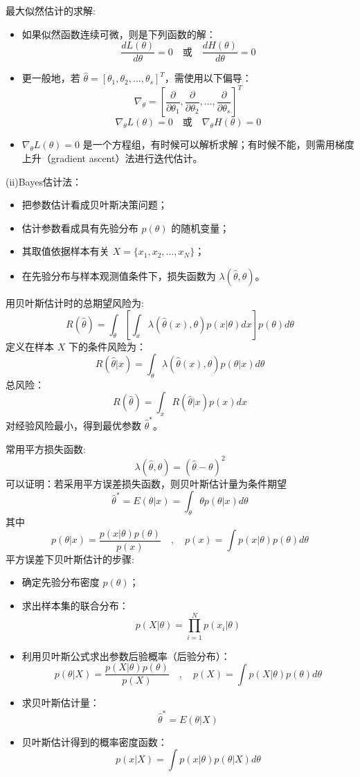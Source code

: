 \documentclass{article}
\begin{document}
最大似然估计的求解:
\begin{itemize}
    \item 如果似然函数连续可微，则是下列函数的解：
    \[
    \frac{dL(\theta)}{d\theta} = 0 \quad \text{或} \quad \frac{dH(\theta)}{d\theta} = 0
    \]
    \item 更一般地，若 $\hat{\theta} = [\theta_1, \theta_2, \ldots, \theta_s]^T$，需使用以下偏导：
    \[
    \nabla_\theta = \left[ \frac{\partial}{\partial \theta_1}, \frac{\partial}{\partial \theta_2}, \ldots, \frac{\partial}{\partial \theta_s} \right]^T
    \]
    \[
    \nabla_\theta L(\theta) = 0 \quad \text{或} \quad \nabla_\theta H(\theta) = 0
    \]
    \item $\nabla_\theta L(\theta) = 0$ 是一个方程组，有时候可以解析求解；有时候不能，则需用梯度上升（gradient ascent）法进行迭代估计。
\end{itemize}
(ii)Bayes估计法：

\begin{itemize}
  \item 把参数估计看成贝叶斯决策问题；
  \item 估计参数看成具有先验分布 $p(\theta)$ 的随机变量；
  \item 其取值依据样本有关 $X = \{x_1, x_2, \dots, x_N\}$；
  \item 在先验分布与样本观测值条件下，损失函数为 $\lambda(\hat{\theta}, \theta)$。
\end{itemize}

用贝叶斯估计时的总期望风险为:
\[
R(\hat{\theta}) = \int_{\theta} \left[ \int_{x} \lambda(\hat{\theta}(x), \theta) p(x|\theta) dx \right] p(\theta) d\theta
\]
定义在样本 $X$ 下的条件风险为：
\[
R(\hat{\theta}|x) = \int_{\theta} \lambda(\hat{\theta}(x), \theta) p(\theta|x) d\theta
\]
总风险：
\[
R(\hat{\theta}) = \int_{x} R(\hat{\theta}|x) p(x) dx
\]
对经验风险最小，得到最优参数 $\hat{\theta}^*$。

常用平方损失函数:
\[
\lambda(\hat{\theta}, \theta) = (\hat{\theta} - \theta)^2
\]
可以证明：若采用平方误差损失函数，则贝叶斯估计量为条件期望
\[
\hat{\theta}^* = E(\theta|x) = \int_{\theta} \theta p(\theta|x) d\theta
\]
其中
\[
p(\theta|x) = \frac{p(x|\theta)p(\theta)}{p(x)} \quad , \quad p(x) = \int p(x|\theta)p(\theta) d\theta
\]
平方误差下贝叶斯估计的步骤:

\begin{itemize}
  \item 确定先验分布密度 $p(\theta)$；
  \item 求出样本集的联合分布：
  \[
  p(X|\theta) = \prod_{i=1}^{N} p(x_i|\theta)
  \]
  \item 利用贝叶斯公式求出参数后验概率（后验分布）：
  \[
  p(\theta|X) = \frac{p(X|\theta)p(\theta)}{p(X)} \quad , \quad p(X) = \int p(X|\theta)p(\theta) d\theta
  \]
  \item 求贝叶斯估计量：
  \[
  \hat{\theta}^* = E(\theta|X)
  \]
  \item 贝叶斯估计得到的概率密度函数：
  \[
  p(x|X) = \int p(x|\theta)p(\theta|X) d\theta
  \]
\end{itemize}
\end{document}
